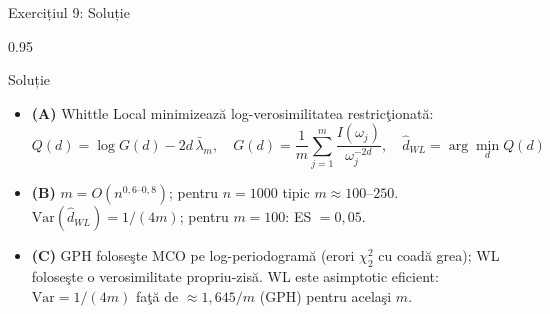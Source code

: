 \documentclass[9pt, aspectratio=169, t]{beamer}
\begin{document}
\begin{frame}{Exercițiul 9: Soluție}
    \begin{cminipage}{0.95\textwidth}
    \begin{exampleblock}{Soluție}
        {\footnotesize
        \begin{itemize}\setlength{\itemsep}{0pt}
            \item \textcolor{MainBlue}{\textbf{(A)}} Whittle Local minimizează log-verosimilitatea restricţionată:
            \[
                Q(d) = \log G(d) - 2d\,\bar{\lambda}_m, \quad G(d) = \frac{1}{m}\sum_{j=1}^{m}\frac{I(\omega_j)}{\omega_j^{-2d}}, \quad \hat{d}_{WL} = \arg\min_d Q(d)
            \]
            \item \textcolor{MainBlue}{\textbf{(B)}} $m=O(n^{0{,}6\text{--}0{,}8})$; pentru $n=1000$ tipic $m\approx 100$--$250$. $\text{Var}(\hat{d}_{WL})=1/(4m)$; pentru $m=100$: ES $=0{,}05$.
            \item \textcolor{MainBlue}{\textbf{(C)}} GPH foloseşte MCO pe log-periodogramă (erori $\chi^2_2$ cu coadă grea); WL foloseşte o verosimilitate propriu-zisă. WL este asimptotic eficient: $\text{Var}=1/(4m)$ faţă de $\approx 1{,}645/m$ (GPH) pentru acelaşi $m$.
        \end{itemize}
        }
    \end{exampleblock}
    \end{cminipage}
\end{frame}
\end{document}
